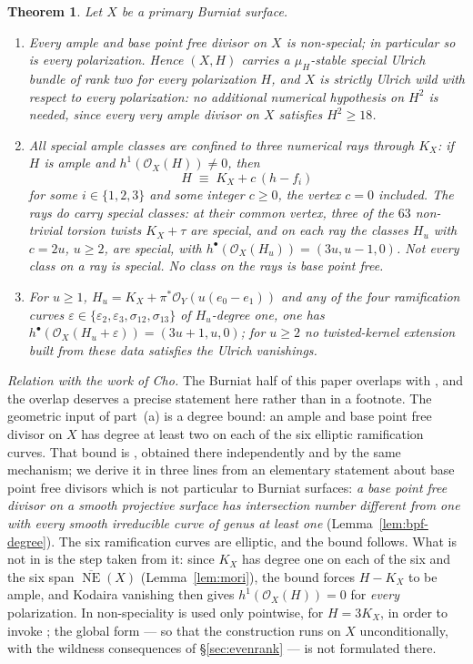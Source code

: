 \documentclass{amsart}
\newtheorem{theorem}{Theorem}[section]
\theoremstyle{definition}
\newcommand{\OO}{\mathcal{O}}
\newcommand{\NE}{\overline{\operatorname{NE}}}
\begin{document}
\begin{theorem}\label{thm:burniat}
Let $X$ be a primary Burniat surface.
\begin{enumerate}[label=\textup{(\alph*)}]
\item \emph{Every} ample and base point free divisor on $X$ is non-special; in particular so is every polarization. Hence $(X,H)$ carries a $\mu_H$-stable special Ulrich bundle of rank two for every polarization $H$, and $X$ is strictly Ulrich wild with respect to \emph{every} polarization: no additional numerical hypothesis on $H^2$ is needed, since every very ample divisor on $X$ satisfies $H^2\ge18$.
\item All special ample classes are confined to three numerical rays through $K_X$: if $H$ is ample and $h^1(\OO_X(H))\neq0$, then
\[
H\;\equiv\;K_X+c\,(h-f_i)
\]
for some $i\in\{1,2,3\}$ and some integer $c\ge0$, the vertex $c=0$ included. The rays do carry special classes: at their common vertex, three of the $63$ non-trivial torsion twists $K_X+\tau$ are special, and on each ray the classes $H_u$ with $c=2u$, $u\ge2$, are special, with $h^\bullet(\OO_X(H_u))=(3u,u-1,0)$. Not every class on a ray is special. No class on the rays is base point free.
\item For $u\ge1$, $H_u=K_X+\pi^*\OO_Y(u(e_0-e_1))$ and any of the four ramification curves $\varepsilon\in\{\varepsilon_2,\varepsilon_3,\sigma_{12},\sigma_{13}\}$ of $H_u$-degree one, one has $h^\bullet(\OO_X(H_u+\varepsilon))=(3u+1,u,0)$; for $u\ge2$ no twisted-kernel extension built from these data satisfies the Ulrich vanishings.
\end{enumerate}
\end{theorem}

\smallskip
\noindent\emph{Relation with the work of Cho.} The Burniat half of this paper overlaps with \cite{Cho26}, and the overlap deserves a precise statement here rather than in a footnote. The geometric input of part~(a) is a degree bound: an ample and base point free divisor on $X$ has degree at least two on each of the six elliptic ramification curves. That bound is \cite[Prop.~5.4]{Cho26}, obtained there independently and by the same mechanism; we derive it in three lines from an elementary statement about base point free divisors which is not particular to Burniat surfaces: \emph{a base point free divisor on a smooth projective surface has intersection number different from one with every smooth irreducible curve of genus at least one} (Lemma~\ref{lem:bpf-degree}). The six ramification curves are elliptic, and the bound follows. What is not in \cite{Cho26} is the step taken from it: since $K_X$ has degree one on each of the six and the six span $\NE(X)$ (Lemma~\ref{lem:mori}), the bound forces $H-K_X$ to be ample, and Kodaira vanishing then gives $h^1(\OO_X(H))=0$ for \emph{every} polarization. In \cite{Cho26} non-speciality is used only pointwise, for $H=3K_X$, in order to invoke \cite{Cas17}; the global form --- so that the construction runs on $X$ unconditionally, with the wildness consequences of \S\ref{sec:evenrank} --- is not formulated there.
\end{document}
